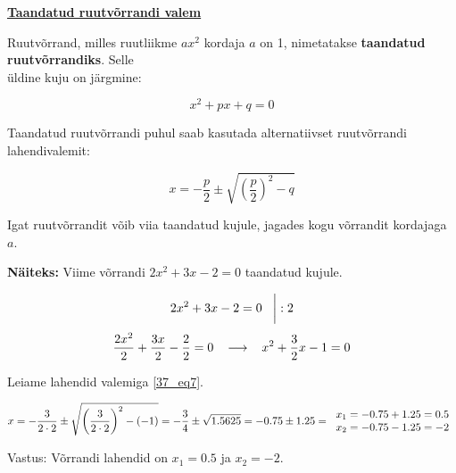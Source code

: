 \begin{center}
{{{\begin{flushleft}
\vspace{5mm}
\hspace{5mm}
\textbf{\underline{Taandatud ruutvõrrandi valem}}

\vspace{2mm}
\hspace{5mm}
Ruutvõrrand, milles ruutliikme $ax^{2}$ kordaja $a$ on 1, nimetatakse \textbf{taandatud ruutvõrrandiks}. Selle\\ \hspace{5mm} üldine kuju on järgmine: 

\begin{equation}
\label{37_eq6}
x^{2}+px+q=0
\end{equation}

\hspace{5mm}
Taandatud ruutvõrrandi puhul saab kasutada alternatiivset ruutvõrrandi lahendivalemit:

\begin{equation}
\label{37_eq7}
\boxed{x=-\dfrac{p}{2} \pm \sqrt{\left( \dfrac{p}{2}\right)^{2}-q}}
\end{equation}

\hspace{5mm}
Igat ruutvõrrandit võib viia taandatud kujule, jagades kogu võrrandit kordajaga $a$.

\vspace{5mm}
\hspace{5mm}
\textbf{Näiteks:} Viime võrrandi $2x^{2}+3x-2=0$ taandatud kujule.

\[ 2x^{2}+3x-2=0 \hspace{3mm} \bigg| : 2  \]
\[ \dfrac{2x^{2}}{2}+\dfrac{3x}{2} - \dfrac{2}{2}=0 \hspace{3mm} \longrightarrow \hspace{3mm} x^{2}+\dfrac{3}{2}x-1=0\]

\vspace{2mm}
\hspace{5mm}
Leiame lahendid valemiga \ref{37_eq7}.

\[ x=-\dfrac{3}{2 \cdot 2} \pm \sqrt{\left(\dfrac{3}{2 \cdot 2} \right)^{2}-(-1)} = -\dfrac{3}{4} \pm \sqrt{1.5625}= -0.75 \pm 1.25 = \begin{tabular}{c}
$x_{1}=-0.75 + 1.25 = 0.5$\\
$x_{2}=-0.75 - 1.25 = -2$
\end{tabular} \]

\vspace{2mm}
\hspace{5mm}
Vastus: Võrrandi lahendid on $x_{1}=0.5$ ja $x_{2}=-2$.


\end{flushleft}}}}
\end{center}
